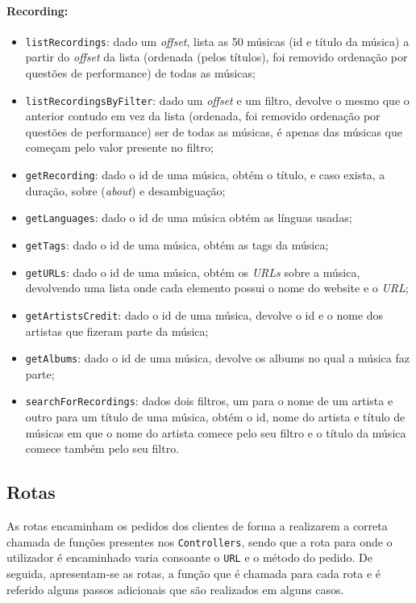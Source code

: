 \documentclass{article}
\begin{document}
\paragraph{\textbf{Recording:}}
    \begin{itemize}
        \item \texttt{listRecordings}: dado um \textit{offset}, lista as 50 músicas (id e título da música) a partir do \textit{offset} da lista (ordenada (pelos títulos), foi removido ordenação por questões de performance) de todas as músicas;
        \item \texttt{listRecordingsByFilter}: dado um \textit{offset} e um filtro, devolve o mesmo que o anterior contudo em vez da lista (ordenada, foi removido ordenação por questões de performance) ser de todas as músicas, é apenas das músicas que começam pelo valor presente no filtro;
        \item \texttt{getRecording}: dado o id de uma música, obtém o título, e caso exista, a duração, sobre (\textit{about}) e desambiguação;
        \item \texttt{getLanguages}: dado o id de uma música obtém as línguas usadas;
        \item \texttt{getTags}: dado o id de uma música, obtém as tags da música;
        \item \texttt{getURLs}: dado o id de uma música, obtém os \textit{URLs} sobre a música, devolvendo uma lista onde cada elemento possui o nome do website e o \textit{URL};
        \item \texttt{getArtistsCredit}: dado o id de uma música, devolve o id e o nome dos artistas que fizeram parte da música;
        \item \texttt{getAlbums}: dado o id de uma música, devolve os albums no qual a música faz parte;
        \item \texttt{searchForRecordings}: dados dois filtros, um para o nome de um artista e outro para um título de uma música, obtém o id, nome do artista e título de músicas em que o nome do artista comece pelo seu filtro e o título da música comece também pelo seu filtro.
    \end{itemize}

\subsection{Rotas}

As rotas encaminham os pedidos dos clientes de forma a realizarem a correta chamada de funções presentes nos \texttt{Controllers}, sendo que a rota para onde o utilizador é encaminhado varia consoante o \texttt{URL} e o método do pedido.
De seguida, apresentam-se as rotas, a função que é chamada para cada rota e é referido alguns passos adicionais que são realizados em alguns casos.
\end{document}
